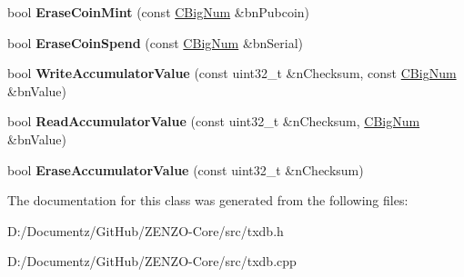 \begin{DoxyCompactItemize}
bool {\bfseries Erase\+Coin\+Mint} (const \mbox{\hyperlink{class_c_big_num}{C\+Big\+Num}} \&bn\+Pubcoin)
\item 
\mbox{\label{class_c_zerocoin_d_b_ae370638a6807897728027a73e46fa090}} 
bool {\bfseries Erase\+Coin\+Spend} (const \mbox{\hyperlink{class_c_big_num}{C\+Big\+Num}} \&bn\+Serial)
\item 
\mbox{\label{class_c_zerocoin_d_b_a189468104c0cbff0c4cf6032f1243acf}} 
bool {\bfseries Write\+Accumulator\+Value} (const uint32\+\_\+t \&n\+Checksum, const \mbox{\hyperlink{class_c_big_num}{C\+Big\+Num}} \&bn\+Value)
\item 
\mbox{\label{class_c_zerocoin_d_b_a8eb79c950d83952e2db1177c574addb5}} 
bool {\bfseries Read\+Accumulator\+Value} (const uint32\+\_\+t \&n\+Checksum, \mbox{\hyperlink{class_c_big_num}{C\+Big\+Num}} \&bn\+Value)
\item 
\mbox{\label{class_c_zerocoin_d_b_a5ab8298648ee5017ae01d054eaebae0a}} 
bool {\bfseries Erase\+Accumulator\+Value} (const uint32\+\_\+t \&n\+Checksum)
\end{DoxyCompactItemize}


The documentation for this class was generated from the following files\+:\begin{DoxyCompactItemize}
\item 
D\+:/\+Documentz/\+Git\+Hub/\+Z\+E\+N\+Z\+O-\/\+Core/src/txdb.\+h\item 
D\+:/\+Documentz/\+Git\+Hub/\+Z\+E\+N\+Z\+O-\/\+Core/src/txdb.\+cpp\end{DoxyCompactItemize}
